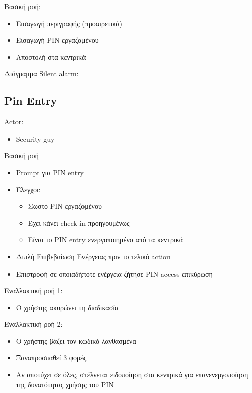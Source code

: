 \documentclass{article}
\begin{document}
\noindent Βασική ροή:
\begin{itemize}
    \item Εισαγωγή περιγραφής (προαιρετικά)
    \item Εισαγωγή PIN εργαζομένου
    \item Αποστολή στα κεντρικά
\end{itemize}


\noindent Διάγραμμα Silent alarm: \\
\noindent{}
\newpage

\subsection{Pin Entry}

\noindent Actor:
\begin{itemize}
    \item Security guy
\end{itemize}

\noindent Βασική ροή
\begin{itemize}
    \item Prompt για PIN entry 
    \item Έλεγχοι:
    \begin{itemize}
        \item Σωστό PIN εργαζομένου
        \item Έχει κάνει check in προηγουμένως
        \item Είναι το PIN entry ενεργοποιημένο από τα κεντρικά
    \end{itemize}
    \item Διπλή Επιβεβαίωση Ενέργειας πριν το τελικό action
    \item Επιστροφή σε οποιαδήποτε ενέργεια ζήτησε PIN access επικύρωση
\end{itemize}

\noindent Εναλλακτική ροή 1:
\begin{itemize}
    \item Ο χρήστης ακυρώνει τη διαδικασία
\end{itemize}

\noindent Εναλλακτική ροή 2:
\begin{itemize}
    \item Ο χρήστης βάζει τον κωδικό λανθασμένα
    \item Ξαναπροσπαθεί 3 φορές
    \item Αν αποτύχει σε όλες, στέλνεται ειδοποίηση στα κεντρικά για επανενεργοποίηση της δυνατότητας χρήσης του PIN
\end{itemize}
\end{document}
